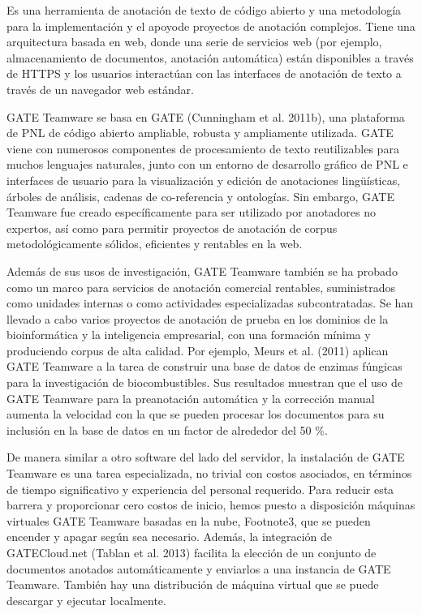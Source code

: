 Es una herramienta de anotación de texto de código abierto y una metodología para la implementación y el apoyode proyectos de anotación complejos. Tiene una arquitectura basada en web, donde una serie de servicios web (por ejemplo, almacenamiento de documentos, anotación automática) están disponibles a través de HTTPS y los usuarios interactúan con las interfaces de anotación de texto a través de un navegador web estándar.

GATE Teamware se basa en GATE (Cunningham et al. 2011b), una plataforma de PNL de código abierto ampliable, robusta y ampliamente utilizada. GATE viene con numerosos componentes de procesamiento de texto reutilizables para muchos lenguajes naturales, junto con un entorno de desarrollo gráfico de PNL e interfaces de usuario para la visualización y edición de anotaciones lingüísticas, árboles de análisis, cadenas de co-referencia y ontologías. Sin embargo, GATE Teamware fue creado específicamente para ser utilizado por anotadores no expertos, así como para permitir proyectos de anotación de corpus metodológicamente sólidos, eficientes y rentables en la web.

Además de sus usos de investigación, GATE Teamware también se ha probado como un marco para servicios de anotación comercial rentables, suministrados como unidades internas o como actividades especializadas subcontratadas. Se han llevado a cabo varios proyectos de anotación de prueba en los dominios de la bioinformática y la inteligencia empresarial, con una formación mínima y produciendo corpus de alta calidad. Por ejemplo, Meurs et al. (2011) aplican GATE Teamware a la tarea de construir una base de datos de enzimas fúngicas para la investigación de biocombustibles. Sus resultados muestran que el uso de GATE Teamware para la preanotación automática y la corrección manual aumenta la velocidad con la que se pueden procesar los documentos para su inclusión en la base de datos en un factor de alrededor del 50 \%.

De manera similar a otro software del lado del servidor, la instalación de GATE Teamware es una tarea especializada, no trivial con costos asociados, en términos de tiempo significativo y experiencia del personal requerido. Para reducir esta barrera y proporcionar cero costos de inicio, hemos puesto a disposición máquinas virtuales GATE Teamware basadas en la nube, Footnote3, que se pueden encender y apagar según sea necesario. Además, la integración de GATECloud.net (Tablan et al. 2013) facilita la elección de un conjunto de documentos anotados automáticamente y enviarlos a una instancia de GATE Teamware. También hay una distribución de máquina virtual que se puede descargar y ejecutar localmente.


